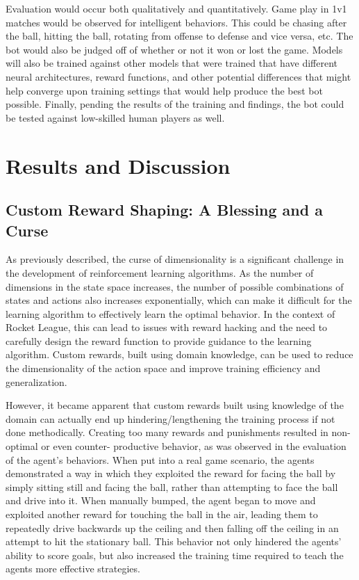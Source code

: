 \documentclass[10pt,twocolumn]{article}
\begin{document}
 Evaluation would occur both qualitatively and 
 quantitatively. Game play in 1v1 matches would be observed 
 for intelligent behaviors. This could be chasing after the 
 ball, hitting the ball, rotating from offense to defense and 
 vice versa, etc. The bot would also be judged off of whether 
 or not it won or lost the game. Models will also be trained 
 against other models that were trained that have different 
 neural architectures, reward functions, and other potential 
 differences that might help converge upon training settings 
 that would help produce the best bot possible. Finally, 
 pending the results of the training and findings, the bot 
 could be tested against low-skilled human players as well. 

\section{Results and Discussion}

\subsection{Custom Reward Shaping: A Blessing and a Curse}

 As previously described, the curse of dimensionality is a significant challenge in the development of 
 reinforcement learning algorithms. As the number of dimensions in the state space increases, the number 
 of possible combinations of states and actions also increases exponentially, which can make it difficult 
 for the learning algorithm to effectively learn the optimal behavior. In the context of Rocket League, 
 this can lead to issues with reward hacking and the need to carefully design the reward function to 
 provide guidance to the learning algorithm. Custom rewards, built using domain knowledge, can be used to 
 reduce the dimensionality of the action space and improve training efficiency and generalization.
 
 However, it became apparent that custom rewards built using 
 knowledge of the domain can actually end up 
 hindering/lengthening the training process if not done 
 methodically. Creating too many rewards and punishments resulted in non-optimal or even counter- productive behavior, as was observed in the evaluation of the 
 agent's behaviors. When put into a real game scenario, the agents demonstrated a way in which they exploited the reward for facing the ball by simply sitting 
 still and facing the ball, rather than attempting to face the ball and drive into it. When manually bumped, the agent began to move and 
 exploited another reward for touching the ball in the air, 
 leading them to repeatedly drive backwards up the ceiling 
 and then falling off the ceiling in an attempt to hit the 
 stationary ball. This behavior not only hindered the agents' 
 ability to score goals, but also increased the training time 
 required to teach the agents more effective strategies.
 
\end{document}
